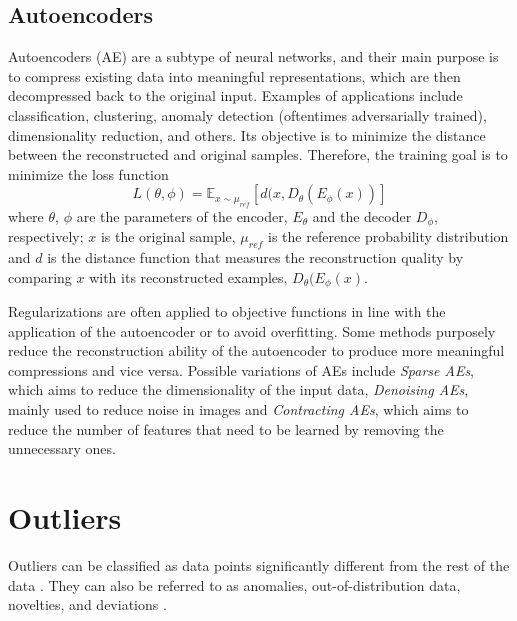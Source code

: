 \subsection{Autoencoders}
Autoencoders (AE) are a subtype of neural networks, and their main purpose is to compress existing data into meaningful representations, which are then decompressed back to the original input. Examples of applications include classification, clustering, anomaly detection (oftentimes adversarially trained), dimensionality reduction, and others. Its objective is to minimize the distance between the reconstructed and original samples. Therefore, the training goal is to minimize the loss function  
\begin{equation}
    L(\theta, \phi) = \mathbb{E}_{x\sim\mu_{ref}}[d(x, D_{\theta}(E_{\phi}(x))]
    \label{eq:ae_objective_func}
\end{equation} where $\theta$, $\phi$ are the parameters of the encoder, $E_\theta$ and the decoder $D_\phi$, respectively; $x$ is the original sample, $\mu_{ref}$ is the reference probability distribution and $d$ is the distance function that measures the reconstruction quality by comparing $x$ with its reconstructed examples, $D_{\theta}(E_{\phi}(x)$.

Regularizations are often applied to objective functions in line with the application of the autoencoder or to avoid overfitting. Some methods purposely reduce the reconstruction ability of the autoencoder to produce more meaningful compressions and vice versa. Possible variations of AEs include \textit{Sparse AEs}, which aims to reduce the dimensionality of the input data, \textit{Denoising AEs}, mainly used to reduce noise in images and \textit{Contracting AEs}, which aims to reduce the number of features that need to be learned by removing the unnecessary ones. %


\section{Outliers}
Outliers can be classified as data points significantly different from the rest of the data \cite{aggarwal_OutlierAnalysis_2013}. They can also be referred to as anomalies, out-of-distribution data, novelties, and deviations \cite{aggarwal_OutlierAnalysis_2013, xia.etal_GANbasedAnomalyDetection_2022}.

